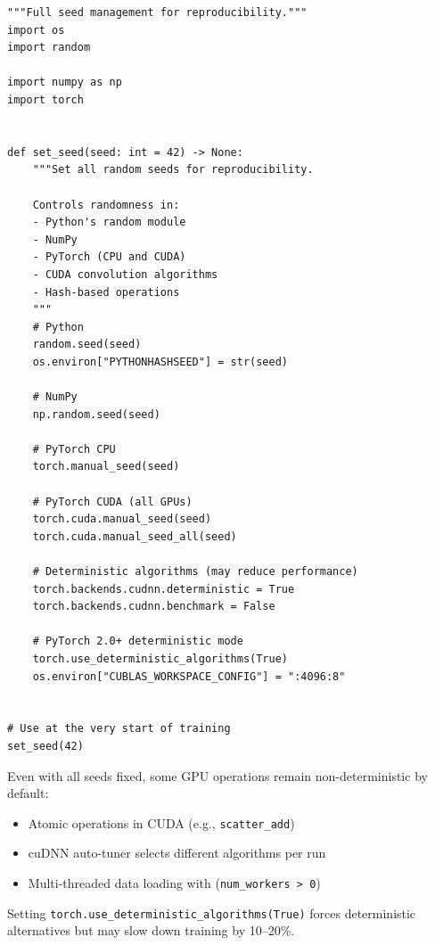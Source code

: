 \begin{codeblock}[title=\textbf{Complete random seed management}]
\begin{verbatim}
"""Full seed management for reproducibility."""
import os
import random

import numpy as np
import torch


def set_seed(seed: int = 42) -> None:
    """Set all random seeds for reproducibility.

    Controls randomness in:
    - Python's random module
    - NumPy
    - PyTorch (CPU and CUDA)
    - CUDA convolution algorithms
    - Hash-based operations
    """
    # Python
    random.seed(seed)
    os.environ["PYTHONHASHSEED"] = str(seed)

    # NumPy
    np.random.seed(seed)

    # PyTorch CPU
    torch.manual_seed(seed)

    # PyTorch CUDA (all GPUs)
    torch.cuda.manual_seed(seed)
    torch.cuda.manual_seed_all(seed)

    # Deterministic algorithms (may reduce performance)
    torch.backends.cudnn.deterministic = True
    torch.backends.cudnn.benchmark = False

    # PyTorch 2.0+ deterministic mode
    torch.use_deterministic_algorithms(True)
    os.environ["CUBLAS_WORKSPACE_CONFIG"] = ":4096:8"


# Use at the very start of training
set_seed(42)
\end{verbatim}
\end{codeblock}

\begin{warning}[title=\textbf{Limits of determinism on GPU}]
Even with all seeds fixed, some GPU operations remain non-deterministic
by default:
\begin{itemize}
  \item Atomic operations in CUDA (e.g., \texttt{scatter\_add})
  \item cuDNN auto-tuner selects different algorithms per run
  \item Multi-threaded data loading with 
    (\texttt{num\_workers > 0})
\end{itemize}
Setting \texttt{torch.use\_deterministic\_algorithms(True)} forces
deterministic alternatives but may slow down training by 10--20\%.
\end{warning}

